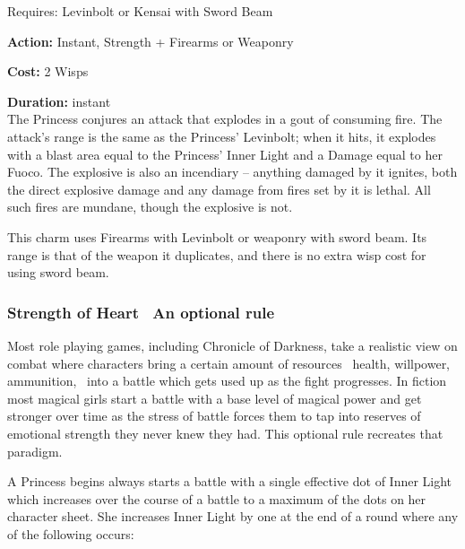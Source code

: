 \noindent Requires: Levinbolt or Kensai with Sword Beam

\noindent \textbf{Action:} Instant, Strength + Firearms or Weaponry

\noindent \textbf{Cost:} 2 Wisps

\noindent \textbf{Duration:} instant\\

\noindent The Princess conjures an attack that explodes in a gout of consuming fire. The attack's range is the same as the Princess' Levinbolt; when it hits, it explodes with a blast area equal to the Princess' Inner Light and a Damage equal to her Fuoco. The explosive is also an incendiary -- anything damaged by it ignites, both the direct explosive damage and any damage from fires set by it is lethal. All such fires are mundane, though the explosive is not. 

This charm uses Firearms with Levinbolt or weaponry with sword beam. Its range is that of the weapon it duplicates, and there is no extra wisp cost for using sword beam.

\bigsidebarstart
 
 \subsubsection{Strength of Heart \textemdash\, An optional rule} 
 
 Most role playing games, including Chronicle of Darkness, take a realistic view on combat where characters bring a certain amount of resources \textemdash\, health, willpower, ammunition, \textemdash\, into a battle which gets used up as the fight progresses. In fiction most magical girls start a battle with a base level of magical power and get stronger over time as the stress of battle forces them to tap into reserves of emotional strength they never knew they had. This optional rule recreates that paradigm. 
  
  A Princess begins always starts a battle with a single effective dot of Inner Light which increases over the course of a battle to a maximum of the dots on her character sheet. She increases Inner Light by one at the end of a round where any of the following occurs: 
 
